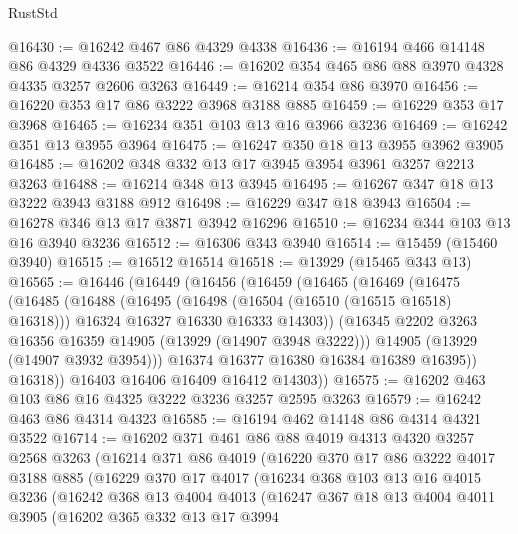 \begin{lexlean}{RustStd}
\begin{coremodule}
{\begin{coremodule}
{{{{{{{{{{{{{{{{{{{{{{{{{{{{{{{{{{{{{@16430 := @16242 @467 @86 @4329 @4338
@16436 := @16194 @466 @14148 @86 @4329 @4336 @3522
@16446 := @16202 @354 @465 @86 @88 @3970 @4328 @4335 @3257 @2606 @3263
@16449 := @16214 @354 @86 @3970
@16456 := @16220 @353 @17 @86 @3222 @3968 @3188 @885
@16459 := @16229 @353 @17 @3968
@16465 := @16234 @351 @103 @13 @16 @3966 @3236
@16469 := @16242 @351 @13 @3955 @3964
@16475 := @16247 @350 @18 @13 @3955 @3962 @3905
@16485 := @16202 @348 @332 @13 @17 @3945 @3954 @3961 @3257 @2213 @3263
@16488 := @16214 @348 @13 @3945
@16495 := @16267 @347 @18 @13 @3222 @3943 @3188 @912
@16498 := @16229 @347 @18 @3943
@16504 := @16278 @346 @13 @17 @3871 @3942 @16296
@16510 := @16234 @344 @103 @13 @16 @3940 @3236
@16512 := @16306 @343 @3940
@16514 := @15459 (@15460 @3940)
@16515 := @16512 @16514
@16518 := @13929 (@15465 @343 @13)
@16565 := @16446
    (@16449
      (@16456
        (@16459
          (@16465
            (@16469
              (@16475
                (@16485
                  (@16488
                    (@16495
                      (@16498 (@16504 (@16510 (@16515 @16518) @16318)))
                      @16324
                      @16327
                      @16330
                      @16333
                      @14303))
                  (@16345 @2202 @3263 @16356 @16359 @14905 (@13929 (@14907 @3948 @3222)))
                  @14905
                  (@13929 (@14907 @3932 @3954)))
                @16374
                @16377
                @16380
                @16384
                @16389
                @16395))
            @16318))
        @16403
        @16406
        @16409
        @16412
        @14303))
@16575 := @16202 @463 @103 @86 @16 @4325 @3222 @3236 @3257 @2595 @3263
@16579 := @16242 @463 @86 @4314 @4323
@16585 := @16194 @462 @14148 @86 @4314 @4321 @3522
@16714 := @16202
    @371
    @461
    @86
    @88
    @4019
    @4313
    @4320
    @3257
    @2568
    @3263
    (@16214
      @371
      @86
      @4019
      (@16220
        @370
        @17
        @86
        @3222
        @4017
        @3188
        @885
        (@16229
          @370
          @17
          @4017
          (@16234
            @368
            @103
            @13
            @16
            @4015
            @3236
            (@16242
              @368
              @13
              @4004
              @4013
              (@16247
                @367
                @18
                @13
                @4004
                @4011
                @3905
                (@16202
                  @365
                  @332
                  @13
                  @17
                  @3994
}}}}}}}}}}}}}}}}}}}}}}}}}}}}}}}}}}}}}
\end{coremodule}}
\end{coremodule}
\end{lexlean}
